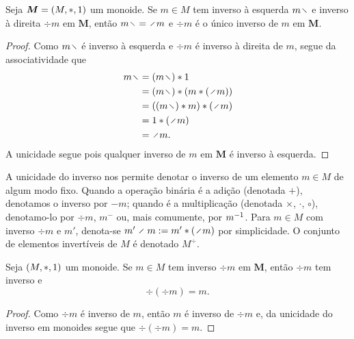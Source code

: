 \begin{proposition}
\label{prop:unic.inv}
Seja $\bm M = (M,\ast,1)$ um monoide. Se $m \in M$ tem inverso à esquerda $m \vid$ e inverso à direita $\div m$ em $\bm M$, então $m \vid = \div m$ e $\div m$ é o único inverso de $m$ em $\bm M$.
\end{proposition}
\begin{proof}
Como $m \vid$ é inverso à esquerda e $\div m$ é inverso à direita de $m$, segue da associatividade que
	\begin{align*}
	m \vid &= (m \vid) \opb \id \\
		&= (m \vid) \opb (m \opb (\div m)) \\
		&= ((m \vid) \opb m) \opb (\div m) \\
		&= \id \opb (\div m) \\
		&= \div m.
	\end{align*}
A unicidade segue pois qualquer inverso de $m$ em $\bm M$ é inverso à esquerda.
\end{proof}

\begin{notation}
A unicidade do inverso nos permite denotar o inverso de um elemento $m \in M$ de algum modo fixo. Quando a operação binária é a adição (denotada $+$), denotamos o inverso por $-m$; quando é a multiplicação (denotada $\times$, $\cdot$, $\circ$), denotamo-lo por $\div m$, $m^{-}$ ou, mais comumente, por $m^{-1}$. Para $m \in M$ com inverso $\div m$ e $m'$, denota-se $m' \div m := m' \opb (\div m)$ por simplicidade. O conjunto de elementos invertíveis de $M$ é denotado $M^{\div}$.
\end{notation}

\begin{proposition}
Seja $(M,\ast,1)$ um monoide. Se $m \in M$ tem inverso $\div m$ em $\bm M$, então $\div m$ tem inverso e
	\begin{equation*}
	\div(\div m) = m.
	\end{equation*}
\end{proposition}
\begin{proof}
Como $\div m$ é inverso de $m$, então $m$ é inverso de $\div m$ e, da unicidade do inverso em monoides segue que $\div(\div m) = m$.
\end{proof}


